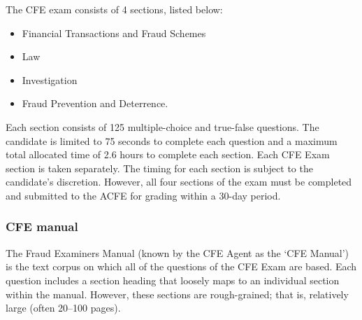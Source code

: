 The CFE exam consists of 4 sections, listed below:

\begin{itemize}
\item Financial Transactions and Fraud Schemes 
\item Law 
\item Investigation
\item Fraud Prevention and Deterrence.  
\end{itemize}

Each section consists of 125 multiple-choice and true-false questions.  The candidate is limited to 75 seconds to complete each question and a maximum total allocated time of 2.6 hours to complete each section.  Each CFE Exam section is taken separately.  The timing for each section is subject to the candidate’s discretion.  However, all four sections of the exam must be completed and submitted to the ACFE for grading within a 30-day period.

\subsubsection{CFE manual}

The Fraud Examiners Manual (known by the CFE Agent as the `CFE Manual') is the text corpus on which all of the questions of the CFE Exam are based.  Each question includes a section heading that loosely maps to an individual section within the manual.  However, these sections are rough-grained; that is, relatively large (often 20--100 pages).  








